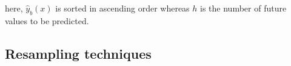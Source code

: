 \documentclass[ijoc,sglanonrev]{informs4}
\begin{document}
here, $\hat{y}_{b}(x)$  is  sorted in ascending order whereas $h$ is the number of future values to be predicted.

\subsection{Resampling techniques} \label{Subsec:resampling}

\end{document}

